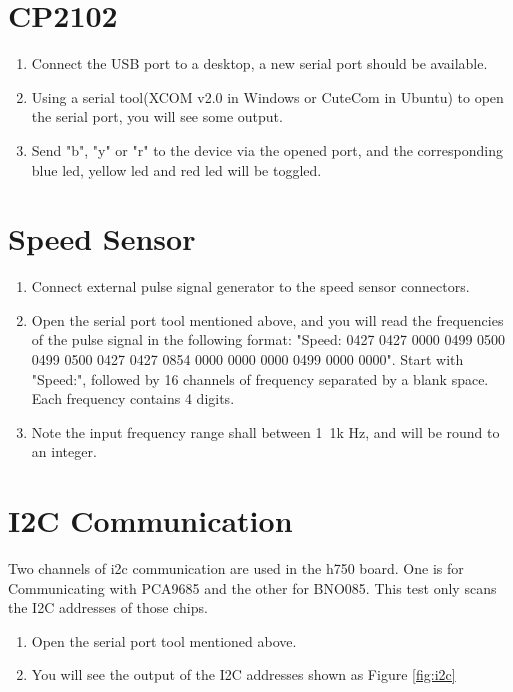 \documentclass{article}
\begin{document}
\section{CP2102}

\begin{enumerate}
    \item Connect the USB port to a desktop, a new serial port should be available.
    \item Using a serial tool(XCOM v2.0 in Windows or CuteCom in Ubuntu) to open the serial port, you will see some output. 
    \item Send "b", "y" or "r" to the device via the opened port, and the corresponding blue led, yellow led and red led will be toggled.
\end{enumerate}

\section{Speed Sensor}

\begin{enumerate}
    \item Connect external pulse signal generator to the speed sensor connectors.
    \item Open the serial port tool mentioned above, and you will read the frequencies of the pulse signal in the following format: "Speed: 0427 0427 0000 0499 0500 0499 0500 0427 0427 0854 0000 0000 0000 0499 0000 0000". Start with "Speed:", followed by 16 channels of frequency separated by a blank space. Each frequency contains 4 digits.   
    \item Note the input frequency range shall between 1~1k Hz, and will be round to an integer.
\end{enumerate}

\section{I2C Communication}
Two channels of i2c communication are used in the h750 board. One is for Communicating with PCA9685 and the other for BNO085. This test only scans the I2C addresses of those chips. 
\begin{enumerate}
    \item Open the serial port tool mentioned above. 
    \item You will see the output of the I2C addresses shown as Figure \ref{fig:i2c}
\end{enumerate}
\end{document}
